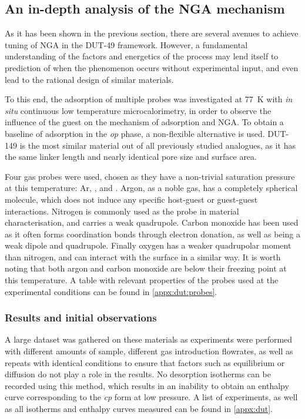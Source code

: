 
\subsection{An in-depth analysis of the NGA mechanism}%
\label{dut:indepth}

As it has been shown in the previous section, there are 
several avenues to achieve tuning of NGA in the DUT-49 framework.
However, a fundamental understanding of the factors and 
energetics of the process may lend itself to prediction of
when the phenomenon occurs without 
experimental input, and even lead to the rational design of 
similar materials.

To this end, the adsorption of multiple probes was investigated 
at \SI{77}{\kelvin} with \textit{in situ} continuous low 
temperature microcalorimetry,
in order to observe the influence of the guest on the mechanism of
adsorption and NGA. To obtain a baseline of adsorption in 
the \textit{op} phase, a non-flexible alternative is used. 
DUT-149 is the most similar material out of all previously studied
analogues, as it has the same linker length and nearly identical pore
size and surface area.

Four gas probes were used, chosen as they 
have a non-trivial saturation pressure at this temperature: Ar,
,  and . Argon, as a 
noble gas, has a completely spherical molecule, which does not 
induce any specific host-guest or guest-guest interactions. Nitrogen
is commonly used as the probe in material characterisation, 
and carries a weak quadrupole. Carbon monoxide has been used 
as it often forms coordination bonds through electron donation,
as well as being a weak dipole and quadrupole.
Finally oxygen has a weaker quadrupolar moment than 
nitrogen, and can interact with the surface in a similar way.
It is worth noting that both argon and carbon monoxide are below 
their freezing point at this temperature. A table with 
relevant properties of the probes used at the experimental
conditions can be found in \autoref{appx:dut:probes}.

\subsubsection{Results and initial observations}

A large dataset was gathered
on these materials as experiments were performed with different 
amounts of sample, different gas introduction flowrates, as well as repeats
with identical conditions to ensure that factors such as 
equilibrium or diffusion do not play a role in the results. 
No desorption isotherms can be recorded using this method, which
results in an inability to obtain an enthalpy curve corresponding 
to the \textit{cp} form at low pressure. A list 
of experiments, as well as all isotherms and enthalpy curves measured can
be found in \autoref{appx:dut}.

